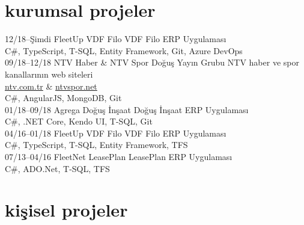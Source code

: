 \documentclass[]{../friggeri-cv} %
\begin{document}
\section{kurumsal projeler}

\begin{entrylist}

\entry
{12/18--Şimdi}
{FleetUp}
{VDF Filo}
{VDF Filo ERP Uygulaması
\\C\#, TypeScript, T-SQL, Entity Framework, Git, Azure DevOps}
\\
\entry
{09/18--12/18}
{NTV Haber \& NTV Spor}
{Doğuş Yayın Grubu}
{NTV haber ve spor kanallarının web siteleri
\\\href{https://www.ntv.com.tr/}{ntv.com.tr} \& \href{http://www.ntvspor.net/}{ntvspor.net}
\\C\#, AngularJS, MongoDB, Git}
\\
\entry
{01/18--09/18}
{Agrega}
{Doğuş İnşaat}
{Doğuş İnşaat ERP Uygulaması
\\C\#, .NET Core, Kendo UI, T-SQL, Git}
\\
\entry
{04/16--01/18}
{FleetUp}
{VDF Filo}
{VDF Filo ERP Uygulaması
\\C\#, TypeScript, T-SQL, Entity Framework, TFS}
\\
\entry
{07/13--04/16}
{FleetNet}
{LeasePlan}
{LeasePlan ERP Uygulaması
\\C\#, ADO.Net, T-SQL, TFS}

\end{entrylist}

\section{kişisel projeler}
\end{document}
